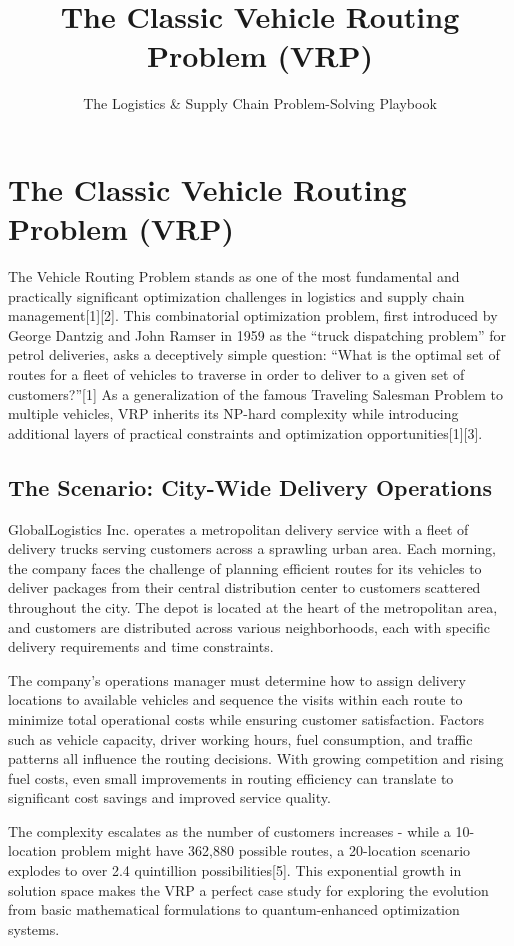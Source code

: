 \documentclass{article}
\title{The Classic Vehicle Routing Problem (VRP)}
\author{The Logistics \& Supply Chain Problem-Solving Playbook}
\date{}
\begin{document}
\maketitle

\section{The Classic Vehicle Routing Problem (VRP)}

The Vehicle Routing Problem stands as one of the most fundamental and practically significant optimization challenges in logistics and supply chain management[1][2]. This combinatorial optimization problem, first introduced by George Dantzig and John Ramser in 1959 as the ``truck dispatching problem'' for petrol deliveries, asks a deceptively simple question: ``What is the optimal set of routes for a fleet of vehicles to traverse in order to deliver to a given set of customers?''[1] As a generalization of the famous Traveling Salesman Problem to multiple vehicles, VRP inherits its NP-hard complexity while introducing additional layers of practical constraints and optimization opportunities[1][3].

\subsection{The Scenario: City-Wide Delivery Operations}

GlobalLogistics Inc. operates a metropolitan delivery service with a fleet of delivery trucks serving customers across a sprawling urban area. Each morning, the company faces the challenge of planning efficient routes for its vehicles to deliver packages from their central distribution center to customers scattered throughout the city. The depot is located at the heart of the metropolitan area, and customers are distributed across various neighborhoods, each with specific delivery requirements and time constraints.

The company's operations manager must determine how to assign delivery locations to available vehicles and sequence the visits within each route to minimize total operational costs while ensuring customer satisfaction. Factors such as vehicle capacity, driver working hours, fuel consumption, and traffic patterns all influence the routing decisions. With growing competition and rising fuel costs, even small improvements in routing efficiency can translate to significant cost savings and improved service quality.

The complexity escalates as the number of customers increases - while a 10-location problem might have 362,880 possible routes, a 20-location scenario explodes to over 2.4 quintillion possibilities[5]. This exponential growth in solution space makes the VRP a perfect case study for exploring the evolution from basic mathematical formulations to quantum-enhanced optimization systems.
\end{document}
